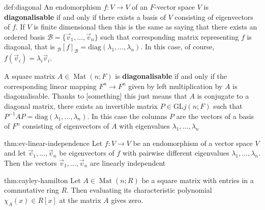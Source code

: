 \documentclass{article}
\DeclareMathOperator{\Mat}{Mat}
\begin{document}
\begin{dfn}[Diagonalisability]{def:diagonal}{}
    An endomorphism $f : V \to V$ of an $F$-vector space $V$ is \textbf{diagonalisable} if and only if there exists a basis of $V$ consisting of eigenvectors of $f$. If $V$ is finite dimensional then this is the same as saying that there exists an ordered basis $\mathcal{B} = \{\vec{v}_{1},\dots,\vec{v}_{n}\}$ such that corresponding matrix representing $f$ is diagonal, that is $_{\mathcal{B}}[f]_{\mathcal{B}} = \text{diag}(\lambda_{1},\dots,\lambda_{n})$. In this case, of course, $f(\vec{v}_{i}) = \lambda_{i}\vec{v}_{i}$.
    
    A square matrix $A\in \Mat(n;F)$ is \textbf{diagonalisable} if and only if the corresponding linear mapping $F^{n}\to F^{n}$ given by left multiplication by $A$ is diagonalisable. Thanks to [something] this just means that $A$ is conjugate to a diagonal matrix, there exists an invertible matrix $P \in \text{GL}j(n;F)$ such that $P^{-1}AP = \text{diag}(\lambda_{1},\dots,\lambda_{n})$. In this case the columns $P$ are the vectors of a basis of $F^{n}$ consisting of eigenvectors of $A$ with eigenvalues $\lambda_{1},\dots,\lambda_{n}$
\end{dfn}

\newpage
\begin{thm}{thm:ev-linear-independence}{}
    Let $f : V\to V$ be an endomorphism of a vector space $V$ and let $\vec{v}_{1},\dots,\vec{v}_{n}$ be eigenvectors of $f$ with pairwise different eigenvalues $\lambda_{1},\dots,\lambda_{n}$. Then the vectors $\vec{v}_{1},\dots,\vec{v}_{n}$ are linearly independent
\end{thm}

\begin{thm}{thm:cayley-hamilton}{}
    Let $A\in \Mat(n;R)$ be a square matrix with entries in a commutative ring $R$. Then evaluating its characteristic polynomial $\chi_{A}(x)\in R[x]$ at the matrix $A$ gives zero.
\end{thm}
\end{document}
